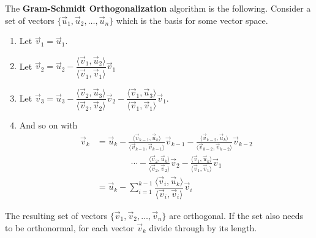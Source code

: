 \begin{Boxed*}
The \textbf{Gram-Schmidt Orthogonalization} algorithm is the following.  Consider a set of vectors $\{\vec{u}_1,\vec{u}_2, \ldots, \vec{u}_n\}$ which is the basis for some vector space.  

\begin{enumerate}
\item Let $\vec{v}_1=\vec{u}_1$. 
\item Let $\vec{v}_2 = \vec{u}_2 - \dfrac{\langle \vec{v}_1,\vec{u}_2 \rangle}{\langle \vec{v}_1,\vec{v}_1 \rangle} \vec{v}_1$
\item Let $\vec{v}_3 = \vec{u}_3 - \dfrac{\langle \vec{v}_2,\vec{u}_3 \rangle}{\langle \vec{v}_2,\vec{v}_2 \rangle} \vec{v}_2-\dfrac{\langle \vec{v}_1,\vec{u}_3 \rangle}{\langle \vec{v}_1,\vec{v}_1 \rangle} \vec{v}_1$. 

\item And so on with 
%
\begin{align*}
\vec{v}_k & = \vec{u}_k - \frac{\langle \vec{v}_{k-1},\vec{u}_k \rangle}{\langle \vec{v}_{k-1},\vec{v}_{k-1} \rangle} \vec{v}_{k-1}-\frac{\langle \vec{v}_{k-2},\vec{u}_k \rangle}{\langle \vec{v}_{k-2},\vec{v}_{k-2} \rangle} \vec{v}_{k-2}  \\
& \qquad \qquad \cdots - \frac{\langle \vec{v}_2,\vec{u}_k \rangle}{\langle \vec{v}_2,\vec{v}_2 \rangle} \vec{v}_2-\frac{\langle \vec{v}_1,\vec{u}_k \rangle}{\langle \vec{v}_1,\vec{v}_1 \rangle} \vec{v}_1 \\
& = \vec{u}_k - \sum_{i=1}^{k-1} \dfrac{\langle \vec{v}_i, \vec{u}_k \rangle}{\langle \vec{v}_i,\vec{v}_i \rangle} \vec{v}_i 
\end{align*}
\end{enumerate}

The resulting set of vectors $\{\vec{v}_1, \vec{v}_2, \ldots, \vec{v}_n\}$ are orthogonal.  If the set also needs to be orthonormal, for each vector $\vec{v}_k$ divide through by its length. 
\end{Boxed*}

